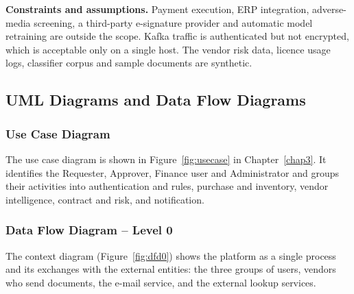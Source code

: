 \noindent\textbf{Constraints and assumptions.} Payment execution, ERP integration, adverse-media screening, a third-party e-signature provider and automatic model retraining are outside the scope. Kafka traffic is authenticated but not encrypted, which is acceptable only on a single host. The vendor risk data, licence usage logs, classifier corpus and sample documents are synthetic.

\subsection{UML Diagrams and Data Flow Diagrams}

\subsubsection{Use Case Diagram}
The use case diagram is shown in Figure~\ref{fig:usecase} in Chapter~\ref{chap3}. It identifies the Requester, Approver, Finance user and Administrator and groups their activities into authentication and rules, purchase and inventory, vendor intelligence, contract and risk, and notification.

\subsubsection{Data Flow Diagram -- Level 0}
The context diagram (Figure~\ref{fig:dfd0}) shows the platform as a single process and its exchanges with the external entities: the three groups of users, vendors who send documents, the e-mail service, and the external lookup services.

